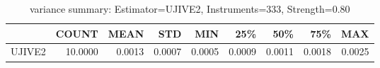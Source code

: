 \begin{table}[ht]
\centering
\caption{variance summary: Estimator=UJIVE2, Instruments=333, Strength=0.80}
\begin{tabular}{lrrrrrrrr}
\toprule
 & COUNT & MEAN & STD & MIN & 25\% & 50\% & 75\% & MAX \\
\midrule
UJIVE2 & 10.0000 & 0.0013 & 0.0007 & 0.0005 & 0.0009 & 0.0011 & 0.0018 & 0.0025 \\
\bottomrule
\end{tabular}
\end{table}
